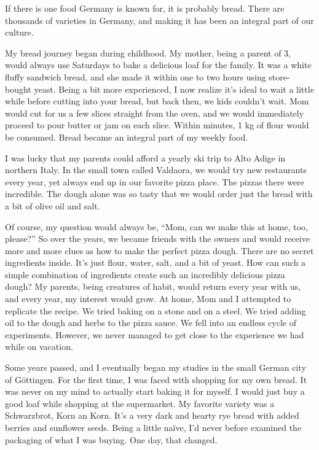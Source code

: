 If there is one food Germany is known for, it is probably bread.
There are thousands of varieties in Germany,
and making it has been an integral part of our culture.

My bread journey began during childhood. My mother, being a parent
of 3, would always use Saturdays to bake a delicious loaf for the family.
It was a white fluffy sandwich bread, and she made it within one to two hours using store-bought yeast.
Being a bit more experienced, I now realize it's
ideal to wait a little while before cutting into your bread, but back then,
we kids couldn't wait. Mom would cut for us a few slices straight from the oven, and we would
immediately proceed to pour butter or jam on each slice. Within minutes, 1 kg of
flour would be consumed. Bread became an integral part of my weekly food.

I was lucky that my parents could afford a yearly ski trip to
Alto Adige in northern Italy. In the small town called Valdaora, we
would try new restaurants every year, yet always end up in our favorite
pizza place. The pizzas there were incredible. The dough
alone was so tasty that we would order just the bread with a
bit of olive oil and salt.

Of course, my question would always be, ``Mom, can we make this at home, too, please?''
So over the years, we became friends with the owners and would receive
more and more clues as how to make the perfect pizza dough. There
are no secret ingredients inside. It's just flour, water, salt, and a bit of yeast.
How can such a simple combination of ingredients create such an incredibly delicious
pizza dough? My parents, being creatures of habit, would return every year with us,
and every year, my interest would grow. At home, Mom and I attempted to replicate
the recipe. We tried baking on a stone and on a steel. We tried adding oil to the dough and herbs
to the pizza sauce. We fell into an endless cycle of experiments. However, we never managed
to get close to the experience we had while on vacation.

Some years passed, and I eventually began my studies in the small German city of Göttingen.
For the first time, I was faced with shopping for my own bread. It was never
on my mind to actually start baking it for myself. I would just buy 
a good loaf while shopping at the supermarket. My favorite variety
was a Schwarzbrot, Korn an Korn. It’s a very dark and hearty rye bread
with added berries and sunflower seeds. Being a little naïve,
I'd never before examined the packaging of what I was buying. One day, that
changed.


